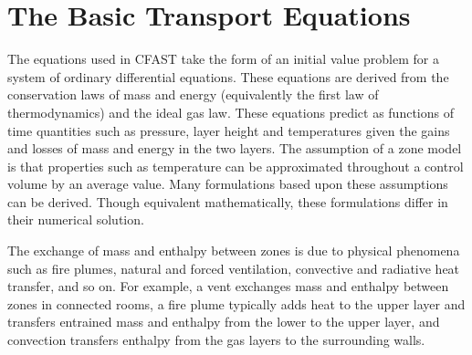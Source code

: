 \chapter{The Basic Transport Equations}
\label{sec:Theory_Chapter}

The equations used in CFAST take the form of an initial value problem for a system of ordinary differential equations. These equations are derived from the conservation laws of mass and energy (equivalently the first law of thermodynamics) and the ideal gas law. These equations predict as functions of time quantities such as pressure, layer height and temperatures given the gains and losses of mass and energy in the two layers. The assumption of a zone model is that properties such as temperature can be approximated throughout a control volume by an average value. Many formulations based upon these assumptions can be derived. Though equivalent mathematically, these formulations differ in their numerical solution.

The exchange of mass and enthalpy between zones is due to physical phenomena such as fire plumes, natural and forced ventilation, convective and radiative heat transfer, and so on. For example, a vent exchanges mass and enthalpy between zones in connected rooms, a fire plume typically adds heat to the upper layer and transfers entrained mass and enthalpy from the lower to the upper layer, and convection transfers enthalpy from the gas layers to the surrounding walls.


